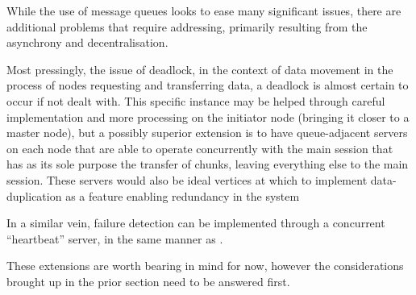 While the use of message queues looks to ease many significant issues, there are additional problems that require addressing, primarily resulting from the asynchrony and decentralisation.

Most pressingly, the issue of deadlock, in the context of data movement in the process of nodes requesting and transferring data, a deadlock is almost certain to occur if not dealt with.
This specific instance may be helped through careful implementation and more processing on the initiator node (bringing it closer to a master node), but a possibly superior extension is to have queue-adjacent servers on each node that are able to operate concurrently with the main \R{} session that has as its sole purpose the transfer of chunks, leaving everything else to the main \R{} session.
These servers would also be ideal vertices at which to implement data-duplication as a feature enabling redundancy in the system

In a similar vein, failure detection can be implemented through a concurrent ``heartbeat'' server, in the same manner as  \cite{white2012hadoop}.

These extensions are worth bearing in mind for now, however the considerations brought up in the prior section need to be answered first.
